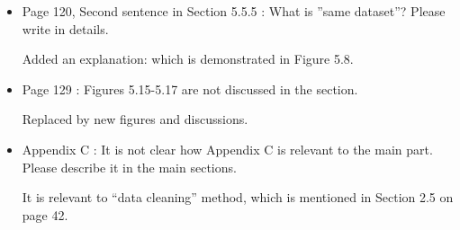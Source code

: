 \documentclass[a4paper,18pt]{extarticle}
\begin{document}
\begin{itemize}
 	\item Page 120, Second sentence in Section 5.5.5 : What is ”same dataset”? Please write in 
details. 
 	
 	Added an explanation: which is demonstrated in Figure 5.8.
 	
 	\item Page 129 : Figures 5.15-5.17 are not discussed in the section. 

 	Replaced by new figures and discussions. 
 	
 	\item  Appendix C : It is not clear how Appendix C is relevant to the main part. Please describe it in the main sections. 

 	It is relevant to ``data cleaning'' method, which is mentioned in Section 2.5 on page 42.
 	

\end{itemize}
\end{document}
